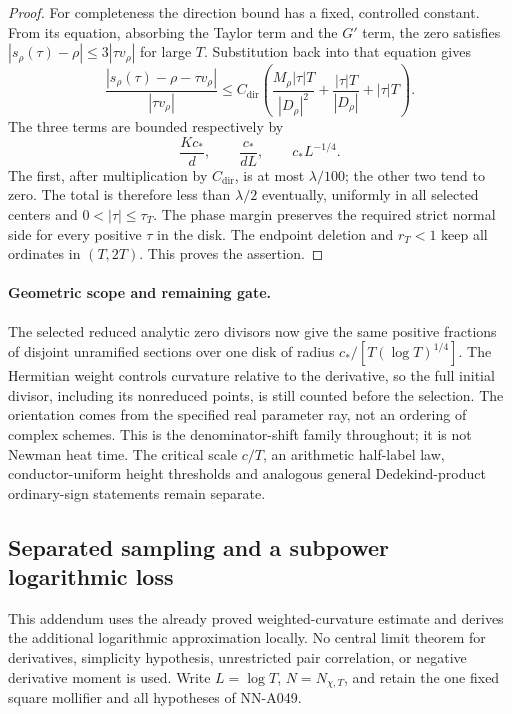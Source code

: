 \begin{proof}
For completeness the direction bound has a fixed,
controlled constant. From its equation, absorbing
the Taylor term and the \(G'\) term, the zero satisfies
\(|s_\rho(\tau)-\rho|\le3|\tau v_\rho|\) for large \(T\).
Substitution back into that equation gives
\[
 \frac{|s_\rho(\tau)-\rho-\tau v_\rho|}{|\tau v_\rho|}
 \le C_{\mathrm{dir}}\left(
       \frac{M_\rho|\tau|T}{|D_\rho|^2}
                  +\frac{|\tau|T}{|D_\rho|}+|\tau|T\right).
\]
The three terms are bounded respectively by
\[
               \frac{Kc_*}{d},\qquad
               \frac{c_*}{dL},\qquad
               c_*L^{-1/4}.
\]
The first, after multiplication by \(C_{\mathrm{dir}}\),
is at most \(\lambda/100\); the other two tend to zero.
The total is therefore less than \(\lambda/2\) eventually,
uniformly in all selected centers and
\(0<|\tau|\le\tau_T\).
The phase margin preserves the required strict normal
side for every positive \(\tau\) in the disk.
The endpoint deletion and \(r_T<1\) keep all ordinates
in \((T,2T)\). This proves the assertion.
\end{proof}

\paragraph{Geometric scope and remaining gate.}
The selected reduced analytic zero divisors now give the
same positive fractions of disjoint unramified sections
over one disk of radius \(c_*/[T(\log T)^{1/4}]\).
The Hermitian weight controls curvature relative to the
derivative, so the full initial divisor, including its
nonreduced points, is still counted before the selection.
The orientation comes from the specified real parameter
ray, not an ordering of complex schemes.
This is the denominator-shift family throughout; it is
not Newman heat time. The critical scale \(c/T\), an
arithmetic half-label law, conductor-uniform height
thresholds and analogous general Dedekind-product
ordinary-sign statements remain separate.


\subsection*{Separated sampling and a subpower logarithmic loss}

This addendum uses the already proved weighted-curvature estimate
and derives the additional logarithmic approximation locally.
No central limit theorem for derivatives, simplicity hypothesis,
unrestricted pair correlation, or negative derivative moment is used.
Write \(L=\log T\), \(N=N_{\chi,T}\), and retain the one fixed
square mollifier and all hypotheses of NN-A049.

